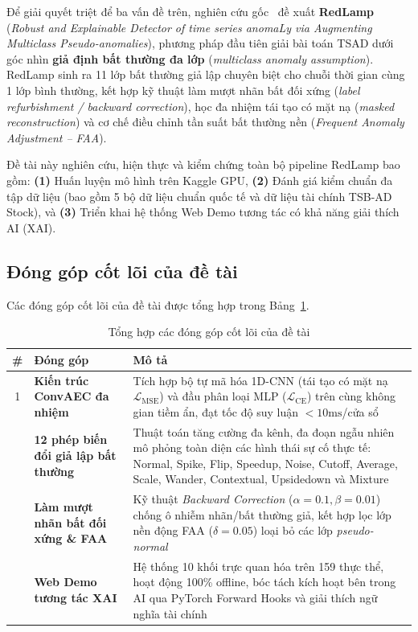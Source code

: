 \documentclass[sigconf,nonacm]{acmart}
\begin{document}
Để giải quyết triệt để ba vấn đề trên, nghiên cứu gốc~\cite{obata2025} đề xuất \textbf{RedLamp} (\textit{Robust and Explainable Detector of time series anomaLy via Augmenting Multiclass Pseudo-anomalies}), phương pháp đầu tiên giải bài toán TSAD dưới góc nhìn \textbf{giả định bất thường đa lớp} (\textit{multiclass anomaly assumption}). RedLamp sinh ra 11 lớp bất thường giả lập chuyên biệt cho chuỗi thời gian cùng 1 lớp bình thường, kết hợp kỹ thuật làm mượt nhãn bất đối xứng (\textit{label refurbishment / backward correction}), học đa nhiệm tái tạo có mặt nạ (\textit{masked reconstruction}) và cơ chế điều chỉnh tần suất bất thường nền (\textit{Frequent Anomaly Adjustment -- FAA}).

Đề tài này nghiên cứu, hiện thực và kiểm chứng toàn bộ pipeline RedLamp bao gồm: \textbf{(1)} Huấn luyện mô hình trên Kaggle GPU, \textbf{(2)} Đánh giá kiểm chuẩn đa tập dữ liệu (bao gồm 5 bộ dữ liệu chuẩn quốc tế và dữ liệu tài chính TSB-AD Stock), và \textbf{(3)} Triển khai hệ thống Web Demo tương tác có khả năng giải thích AI (XAI).

\subsection{Đóng góp cốt lõi của đề tài}

Các đóng góp cốt lõi của đề tài được tổng hợp trong Bảng~\ref{tab:contributions}.

\begin{table}[htbp]
\centering
\caption{Tổng hợp các đóng góp cốt lõi của đề tài}
\label{tab:contributions}
\footnotesize
\begin{tabularx}{\columnwidth}{clX}
\toprule
\textbf{\#} & \textbf{Đóng góp} & \textbf{Mô tả} \\
\midrule
1 & \textbf{Kiến trúc ConvAEC đa nhiệm} & Tích hợp bộ tự mã hóa 1D-CNN (tái tạo có mặt nạ $\mathcal{L}_{\text{MSE}}$) và đầu phân loại MLP ($\mathcal{L}_{\text{CE}}$) trên cùng không gian tiềm ẩn, đạt tốc độ suy luận $<10\text{ms}$/cửa sổ \\
\addlinespace[3pt]
2 & \textbf{12 phép biến đổi giả lập bất thường} & Thuật toán tăng cường đa kênh, đa đoạn ngẫu nhiên mô phỏng toàn diện các hình thái sự cố thực tế: Normal, Spike, Flip, Speedup, Noise, Cutoff, Average, Scale, Wander, Contextual, Upsidedown và Mixture \\
\addlinespace[3pt]
3 & \textbf{Làm mượt nhãn bất đối xứng \& FAA} & Kỹ thuật \textit{Backward Correction} ($\alpha=0.1, \beta=0.01$) chống ô nhiễm nhãn/bất thường giả, kết hợp lọc lớp nền động FAA ($\delta=0.05$) loại bỏ các lớp \textit{pseudo-normal} \\
\addlinespace[3pt]
4 & \textbf{Web Demo tương tác XAI} & Hệ thống 10 khối trực quan hóa trên 159 thực thể, hoạt động 100\% offline, bóc tách kích hoạt bên trong AI qua PyTorch Forward Hooks và giải thích ngữ nghĩa tài chính \\
\bottomrule
\end{tabularx}
\end{table}
\end{document}
